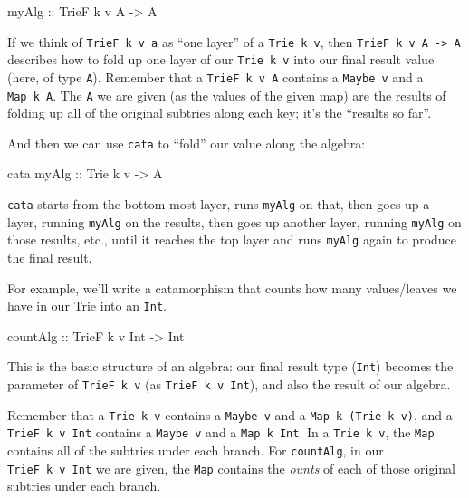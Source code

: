 \documentclass[]{article}
\newenvironment{Shaded}{}{}
\newcommand{\DataTypeTok}[1]{\textcolor[rgb]{0.56,0.13,0.00}{#1}}
\newcommand{\NormalTok}[1]{#1}
\newcommand{\OtherTok}[1]{\textcolor[rgb]{0.00,0.44,0.13}{#1}}
\begin{document}
\begin{Shaded}
\begin{Highlighting}[]
\OtherTok{myAlg ::} \DataTypeTok{TrieF}\NormalTok{ k v }\DataTypeTok{A} \OtherTok{->} \DataTypeTok{A}
\end{Highlighting}
\end{Shaded}

If we think of \texttt{TrieF\ k\ v\ a} as ``one layer'' of a
\texttt{Trie\ k\ v}, then \texttt{TrieF\ k\ v\ A\ -\textgreater{}\ A} describes
how to fold up one layer of our \texttt{Trie\ k\ v} into our final result value
(here, of type \texttt{A}). Remember that a \texttt{TrieF\ k\ v\ A} contains a
\texttt{Maybe\ v} and a \texttt{Map\ k\ A}. The \texttt{A} we are given (as the
values of the given map) are the results of folding up all of the original
subtries along each key; it's the ``results so far''.

And then we can use \texttt{cata} to ``fold'' our value along the algebra:

\begin{Shaded}
\begin{Highlighting}[]
\NormalTok{cata}\OtherTok{ myAlg ::} \DataTypeTok{Trie}\NormalTok{ k v }\OtherTok{->} \DataTypeTok{A}
\end{Highlighting}
\end{Shaded}

\texttt{cata} starts from the bottom-most layer, runs \texttt{myAlg} on that,
then goes up a layer, running \texttt{myAlg} on the results, then goes up
another layer, running \texttt{myAlg} on those results, etc., until it reaches
the top layer and runs \texttt{myAlg} again to produce the final result.

For example, we'll write a catamorphism that counts how many values/leaves we
have in our Trie into an \texttt{Int}.

\begin{Shaded}
\begin{Highlighting}[]
\OtherTok{countAlg ::} \DataTypeTok{TrieF}\NormalTok{ k v }\DataTypeTok{Int} \OtherTok{->} \DataTypeTok{Int}
\end{Highlighting}
\end{Shaded}

This is the basic structure of an algebra: our final result type (\texttt{Int})
becomes the parameter of \texttt{TrieF\ k\ v} (as \texttt{TrieF\ k\ v\ Int}),
and also the result of our algebra.

Remember that a \texttt{Trie\ k\ v} contains a \texttt{Maybe\ v} and a
\texttt{Map\ k\ (Trie\ k\ v)}, and a \texttt{TrieF\ k\ v\ Int} contains a
\texttt{Maybe\ v} and a \texttt{Map\ k\ Int}. In a \texttt{Trie\ k\ v}, the
\texttt{Map} contains all of the subtries under each branch. For
\texttt{countAlg}, in our \texttt{TrieF\ k\ v\ Int} we are given, the
\texttt{Map} contains the \emph{ounts} of each of those original subtries under
each branch.
\end{document}
